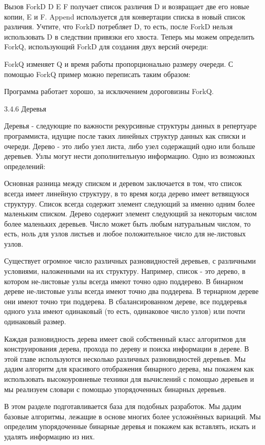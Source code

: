 Вызов {ForkD D E F} получает список различия D и возвращает две его новые копии, E и F. Append используется для конвертации списка в новый список различия. Учтите, что ForkD потребляет D, то есть, после ForkD нельзя использовать D в следствии привязки его хвоста. Теперь мы можем определить ForkQ, использующий ForkD для создания двух версий очереди:

ForkQ изменяет Q и время работы пропорционально размеру очереди. С помощью ForkQ пример можно переписать таким образом:

Программа работает хорошо, за исключением дороговизны ForkQ.

3.4.6 Деревья

Деревья - следующие по важности рекурсивные структуры данных в репертуаре программиста, идущие после таких линейных структур данных как списки и очереди. Дерево - это либо узел листа, либо узел содержащий одно или больше деревьев. Узлы могут нести дополнительную информацию. Одно из возможных определений:

Основная разница между списком и деревом заключается в том, что список всегда имеет линейную структуру, в то время когда дерево имеет ветвящуюся структуру. Список всегда содержит элемент следующий за именно одним более маленьким списком. Дерево содержит элемент следующий за некоторым числом более маленьких деревьев. Число может быть любым натуральным числом, то есть, ноль для узлов листьев и любое положительное число для не-листовых узлов.

Существует огромное число различных разновидностей деревьев, с различными условиями, наложенными на их структуру. Например, список - это дерево, в котором не-листовые узлы всегда имеют точно одно поддерево. В бинарном дереве не-листовые узлы всегда имеют точно два поддерева. В тернарном дереве они имеют точно три поддерева. В сбалансированном дереве, все поддеревья одного узла имеют одинаковый (то есть, одинаковое число узлов) или почти одинаковый размер.

Каждая разновидность дерева имеет свой собственный класс алгоритмов для конструирования дерева, прохода по дереву и поиска информации в дереве. В этой главе используются несколько различных разновидностей деревьев. Мы дадим алгоритм для красивого отображения бинарного дерева, мы покажем как использовать высокоуровневые техники для вычислений с помощью деревьев и мы реализуем словари с помощью упорядоченных бинарных деревьев.

В этом разделе подготавливается база для подобных разработок. Мы дадим базовые алгоритмы, лежащие в основе многих более усложнённых вариаций. Мы определим упорядоченные бинарные деревья и покажем как вставлять, искать и удалять информацию из них.

